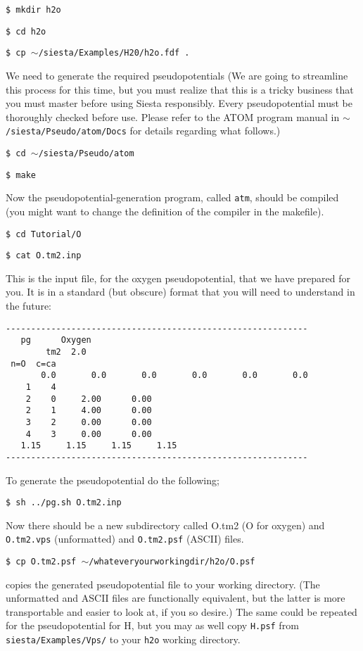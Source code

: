 \documentclass[11pt]{article}
\begin{document}
{\tt \$ mkdir h2o}

{\tt \$ cd h2o}

{\tt \$ cp $\sim$/siesta/Examples/H20/h2o.fdf .}

\noindent
We need to generate the required pseudopotentials
(We are going to streamline this process for this time, but
you must realize that this is a tricky business that you 
must master before using {\sc Siesta} responsibly. Every 
pseudopotential must be thoroughly checked before use. Please refer to
the {\sc ATOM} program manual in {\tt $\sim$/siesta/Pseudo/atom/Docs}
for details regarding what follows.)

{\tt \$ cd $\sim$/siesta/Pseudo/atom}

{\tt \$ make}

\noindent
Now the pseudopotential-generation program, called {\tt atm}, 
should be compiled (you might want to change the definition of
the compiler in the makefile).

{\tt \$ cd Tutorial/O}

{\tt \$ cat O.tm2.inp}

\noindent
This is the input file, for the oxygen pseudopotential, 
that we have prepared for you. 
It is in a standard (but obscure) format that
you will need to understand in the future:
\begin{verbatim}
------------------------------------------------------------
   pg      Oxygen
        tm2  2.0
 n=O  c=ca 
       0.0       0.0       0.0       0.0       0.0       0.0
    1    4
    2    0     2.00      0.00
    2    1     4.00      0.00
    3    2     0.00      0.00
    4    3     0.00      0.00
   1.15     1.15     1.15     1.15
------------------------------------------------------------
\end{verbatim}

To generate the pseudopotential do the following;

{\tt \$ sh ../pg.sh O.tm2.inp}

\noindent
Now there should be a new subdirectory called O.tm2 (O for oxygen)
and {\tt O.tm2.vps} (unformatted) and {\tt O.tm2.psf} (ASCII) files.

{\tt \$ cp O.tm2.psf $\sim$/whateveryourworkingdir/h2o/O.psf}

\noindent
copies the generated pseudopotential file to your working directory. 
(The unformatted and ASCII files are functionally equivalent, but
the latter is more transportable and easier to look at, if you so
desire.) The same could be repeated for the pseudopotential for H,
but you may as well copy {\tt H.psf} from {\tt siesta/Examples/Vps/}
to your {\tt h2o} working directory.
\end{document}
